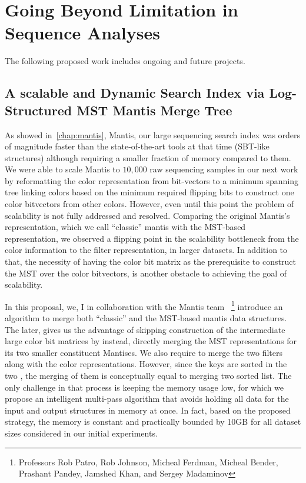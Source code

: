 
\chapter{Going Beyond Limitation in Sequence Analyses}

The following proposed work includes ongoing and future projects.

\section{A scalable and Dynamic Search Index via Log-Structured MST Mantis Merge Tree}

As showed in~\ref{chap:mantis}, Mantis, our large sequencing search index
was orders of magnitude faster than the state-of-the-art tools at that time (SBT-like structures)
although requiring a smaller fraction of memory compared to them.
We were able to scale Mantis to $10,000$ raw sequencing samples in our next work
by reformatting the color representation from bit-vectors to a minimum spanning tree
linking colors based on the minimum required flipping bits
to construct one color bitvectors from other colors.
However, even until this point the problem of scalability is not fully addressed
and resolved.
Comparing the original Mantis's representation, which we call ``classic'' mantis
with the MST-based representation, we observed a flipping point in the scalability bottleneck
from the color information to the \kmer filter representation, \cqf
in larger datasets.
In addition to that, the necessity of having the color bit matrix as the prerequisite
to construct the MST over the color bitvectors, is another obstacle
to achieving the goal of scalability.

In this proposal, we, I in collaboration with the Mantis team
~\footnote{Professors Rob Patro, Rob Johnson, Micheal Ferdman, Micheal Bender, Prashant Pandey, Jamshed Khan,
and Sergey Madaminov} introduce an algorithm to merge both “classic”
and the MST-based mantis data structures. The later, gives us the advantage of skipping
construction of the intermediate large color bit matrices by instead, directly merging
the MST representations for its two smaller constituent Mantises.
We also require to merge the two filters along with the color representations.
However, since the keys are sorted in the two \cqfs, the merging of them
is conceptually equal to merging two sorted list.
The only challenge in that process is keeping the memory usage low,
for which we propose an intelligent multi-pass algorithm that avoids holding
all data for the input and output structures in memory at once.
In fact, based on the proposed strategy, the memory is constant and
practically bounded by 10GB for all dataset sizes considered in our initial experiments.

